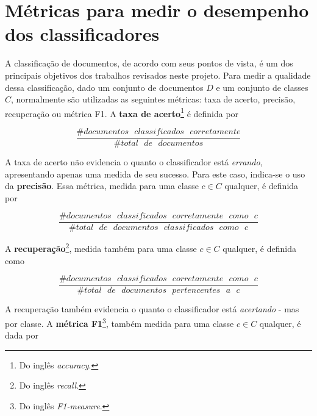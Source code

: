 

\section{Métricas para medir o desempenho dos classificadores}
\label{metricas}

A classificação de documentos, de acordo com seus pontos de vista, é um dos principais objetivos dos trabalhos revisados neste projeto. Para medir a qualidade dessa classificação, dado um conjunto de documentos \ensuremath{D} e um conjunto de classes \ensuremath{C}, normalmente são utilizadas as seguintes métricas: taxa de acerto, precisão, recuperação ou métrica F1. A \textbf{taxa de acerto}\footnote{Do inglês \emph{accuracy}.} é definida por \cite{manning}

\begin{equation}
\label{accuracy}
\ensuremath{\frac{\#documentos\mbox{ }classificados\mbox{ }corretamente}{\#total\mbox{ }de\mbox{ }documentos}}
\end{equation}

A taxa de acerto não evidencia o quanto o classificador está \emph{errando}, apresentando apenas uma medida de seu sucesso. Para este caso, indica-se o uso da \textbf{precisão}. Essa métrica, medida para uma classe \ensuremath{c \in C} qualquer, é definida por \cite{manning}

\begin{equation}
\label{precision}
\ensuremath{\frac{\#documentos\mbox{ }classificados\mbox{ }corretamente\mbox{ }como\mbox{ }c}{\#total\mbox{ }de\mbox{ }documentos\mbox{ }classificados\mbox{ }como\mbox{ }c}}
\end{equation}

A \textbf{recuperação}\footnote{Do inglês \emph{recall}.}, medida também para uma classe \ensuremath{c \in C} qualquer, é definida como \cite{manning}

\begin{equation}
\label{recall}
\ensuremath{\frac{\#documentos\mbox{ }classificados\mbox{ }corretamente\mbox{ }como\mbox{ }c}{\#total\mbox{ }de\mbox{ }documentos\mbox{ }pertencentes\mbox{ }a\mbox{ }c}}
\end{equation}

A recuperação também evidencia o quanto o classificador está \emph{acertando} - mas por classe. A \textbf{métrica F1}\footnote{Do inglês \emph{F1-measure}.}, também medida para uma classe \ensuremath{c \in C} qualquer, é dada por \cite{manning}

